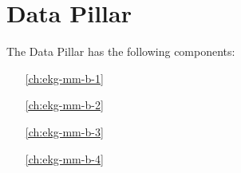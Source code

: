 \setcounter{part}{1}
\part{Data Pillar}\label{pt:ekgmm-b} %

The Data Pillar has the following components:

\begin{itemize}[leftmargin=.5in]
  \item [\ref{ch:ekg-mm-b-1}]  %
  \item [\ref{ch:ekg-mm-b-2}]  %
  \item [\ref{ch:ekg-mm-b-3}]  %
  \item [\ref{ch:ekg-mm-b-4}]  %
\end{itemize}

%
%
%
%
%





